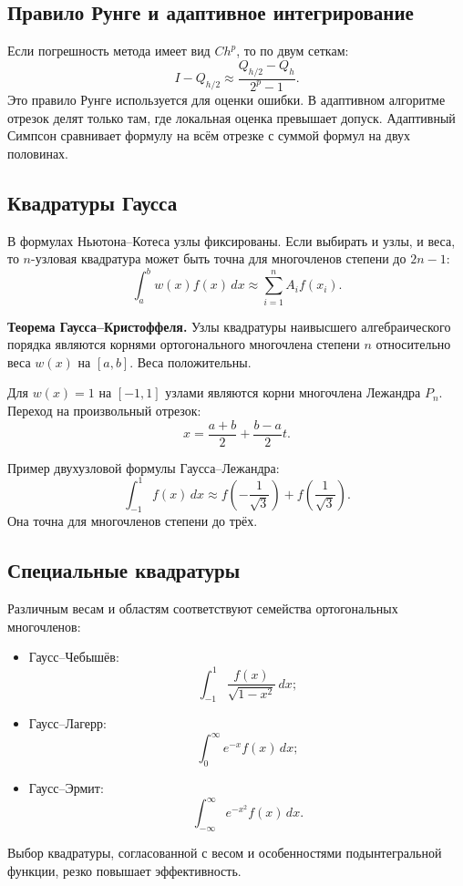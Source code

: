 \subsection{Правило Рунге и адаптивное интегрирование}

Если погрешность метода имеет вид $Ch^p$, то по двум сеткам:
\[
    I-Q_{h/2}\approx\frac{Q_{h/2}-Q_h}{2^p-1}.
\]
Это правило Рунге используется для оценки ошибки. В адаптивном алгоритме отрезок
делят только там, где локальная оценка превышает допуск. Адаптивный Симпсон
сравнивает формулу на всём отрезке с суммой формул на двух половинах.

\subsection{Квадратуры Гаусса}

В формулах Ньютона--Котеса узлы фиксированы. Если выбирать и узлы, и веса, то
$n$-узловая квадратура может быть точна для многочленов степени до $2n-1$:
\[
    \int_a^b w(x)f(x)\,dx
    \approx \sum_{i=1}^{n}A_i f(x_i).
\]

\textbf{Теорема Гаусса--Кристоффеля.}
Узлы квадратуры наивысшего алгебраического порядка являются корнями
ортогонального многочлена степени $n$ относительно веса $w(x)$ на $[a,b]$.
Веса положительны.

Для $w(x)=1$ на $[-1,1]$ узлами являются корни многочлена Лежандра $P_n$.
Переход на произвольный отрезок:
\[
    x=\frac{a+b}{2}+\frac{b-a}{2}t.
\]

Пример двухузловой формулы Гаусса--Лежандра:
\[
    \int_{-1}^{1}f(x)\,dx
    \approx
    f\left(-\frac1{\sqrt3}\right)
    +f\left(\frac1{\sqrt3}\right).
\]
Она точна для многочленов степени до трёх.

\subsection{Специальные квадратуры}

Различным весам и областям соответствуют семейства ортогональных многочленов:
\begin{itemize}
    \item Гаусс--Чебышёв:
    \[
        \int_{-1}^{1}\frac{f(x)}{\sqrt{1-x^2}}\,dx;
    \]
    \item Гаусс--Лагерр:
    \[
        \int_{0}^{\infty}e^{-x}f(x)\,dx;
    \]
    \item Гаусс--Эрмит:
    \[
        \int_{-\infty}^{\infty}e^{-x^2}f(x)\,dx.
    \]
\end{itemize}
Выбор квадратуры, согласованной с весом и особенностями подынтегральной функции,
резко повышает эффективность.

